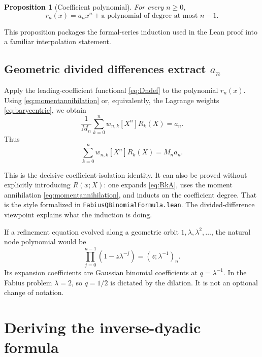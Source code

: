 \documentclass[11pt,oneside]{article}
\newtheorem{proposition}[theorem]{Proposition}
\theoremstyle{definition}
\theoremstyle{remark}
\newcommand{\qpoch}[3]{\left(#1;#2\right)_{#3}}
\newcommand{\coeff}[2]{\left[#1^{#2}\right]}
\begin{document}
\begin{proposition}[Coefficient polynomial]\label{prop:coefficientpoly}
For every $n\ge0$,
\[
 r_n(x)=a_nx^n+\text{a polynomial of degree at most }n-1.
\]
\end{proposition}

This proposition packages the formal-series induction used in the Lean proof into a familiar interpolation statement.

\subsection{Geometric divided differences extract \texorpdfstring{$a_n$}{a[n]}}

Apply the leading-coefficient functional \eqref{eq:Dndef} to the polynomial $r_n(x)$.  Using \eqref{eq:momentannihilation} or, equivalently, the Lagrange weights \eqref{eq:barycentric}, we obtain
\begin{equation}\label{eq:extractan}
 \frac1{M_n}\sum_{k=0}^{n}w_{n,k}
 \coeff{X}{n}R_k(X)=a_n.
\end{equation}
Thus
\begin{equation}\label{eq:weightedR}
 \boxed{
 \sum_{k=0}^{n}w_{n,k}\coeff{X}{n}R_k(X)=M_na_n.}
\end{equation}

This is the decisive coefficient-isolation identity.  It can also be proved without explicitly introducing $R(x;X)$: one expands \eqref{eq:RkA}, uses the moment annihilation \eqref{eq:momentannihilation}, and inducts on the coefficient degree.  That is the style formalized in \texttt{FabiusQBinomialFormula.lean}.  The divided-difference viewpoint explains what the induction is doing.

\begin{greenbox}
If a refinement equation evolved along a geometric orbit $1,\lambda,\lambda^2,\ldots$, the natural node polynomial would be
\[
 \prod_{j=0}^{n-1}(1-z\lambda^{-j})
   =\qpoch{z}{\lambda^{-1}}{n}.
\]
Its expansion coefficients are Gaussian binomial coefficients at $q=\lambda^{-1}$.  In the Fabius problem $\lambda=2$, so $q=1/2$ is dictated by the dilation.  It is not an optional change of notation.
\end{greenbox}


\section{Deriving the inverse-dyadic formula}
\end{document}
